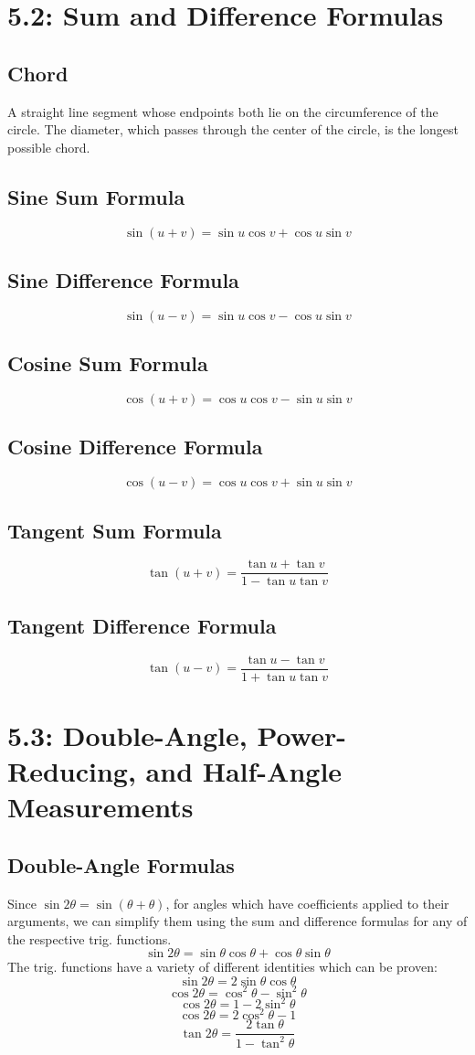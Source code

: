 \documentclass{article}
\begin{document}
\section{5.2: Sum and Difference Formulas}
\subsection{Chord}
A straight line segment whose endpoints both lie on the
circumference of the circle. The diameter, which passes through the center
of the circle, is the longest possible chord.

\subsection{Sine Sum Formula}
\[\sin(u+v)=\sin{u} \cos{v}+ \cos{u}\sin{v}\]

\subsection{Sine Difference Formula}
\[\sin{(u-v)}=\sin{u}\cos{v}-\cos{u}\sin{v}\]

\subsection{Cosine Sum Formula}
\[\cos{(u+v)}=\cos{u}\cos{v}-\sin{u}\sin{v}\]

\subsection{Cosine Difference Formula}
\[\cos{(u-v)}=\cos{u}\cos{v}+\sin{u}\sin{v}\]

\subsection{Tangent Sum Formula}
\[\tan{(u+v)}=\frac{\tan{u}+\tan{v}}{1-\tan{u}\tan{v}}\]

\subsection{Tangent Difference Formula}
\[\tan{(u-v)}=\frac{\tan{u}-\tan{v}}{1+\tan{u}\tan{v}}\]

\section{5.3: Double-Angle, Power-Reducing, and Half-Angle
Measurements}
\subsection{Double-Angle Formulas}
Since $\sin{2\theta}=\sin{(\theta + \theta)}$, for angles which have
coefficients applied to their arguments, we can simplify them using the sum
and difference formulas for any of the respective trig. functions.
\[\sin{2\theta}=\sin{\theta}\cos{\theta}+\cos{\theta}\sin{\theta}\]
The trig. functions have a variety of different identities which can be proven:
\[\sin{2\theta}=2\sin{\theta}\cos{\theta}\]
\[\cos{2\theta}=\cos^2{\theta}-\sin^2{\theta}\]
\[\cos{2\theta}=1-2\sin^2{\theta}\]
\[\cos{2\theta}=2\cos^2{\theta}-1\]
\[\tan{2\theta}=\frac{2\tan{\theta}}{1-\tan^2{\theta}}\]
\end{document}
